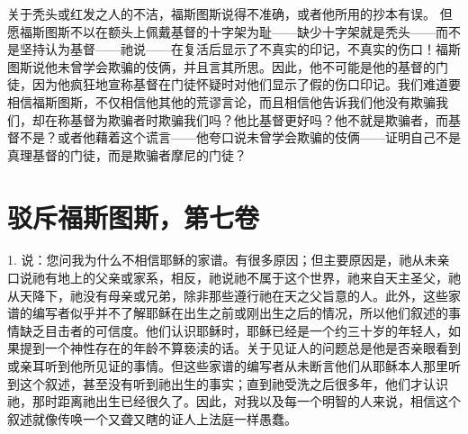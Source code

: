 关于秃头或红发之人的不洁，福斯图斯说得不准确，或者他所用的抄本有误。 但愿福斯图斯不以在额头上佩戴基督的十字架为耻——缺少十字架就是秃头——而不是坚持认为基督——祂说——在复活后显示了不真实的印记，不真实的伤口！福斯图斯说他未曾学会欺骗的伎俩，并且言其所思。因此，他不可能是他的基督的门徒，因为他疯狂地宣称基督在门徒怀疑时对他们显示了假的伤口印记。我们难道要相信福斯图斯，不仅相信他其他的荒谬言论，而且相信他告诉我们他没有欺骗我们，却在称基督为欺骗者时欺骗我们吗？他比基督更好吗？他不就是欺骗者，而基督不是？或者他藉着这个谎言——他夸口说未曾学会欺骗的伎俩——证明自己不是真理基督的门徒，而是欺骗者摩尼的门徒？\par



\section{驳斥福斯图斯，第七卷}

\par

1. 说：您问我为什么不相信耶稣的家谱。有很多原因；但主要原因是，祂从未亲口说祂有地上的父亲或家系，相反，祂说祂不属于这个世界，祂来自天主圣父，祂从天降下，祂没有母亲或兄弟，除非那些遵行祂在天之父旨意的人。此外，这些家谱的编写者似乎并不了解耶稣在出生之前或刚出生之后的情况，所以他们叙述的事情缺乏目击者的可信度。他们认识耶稣时，耶稣已经是一个约三十岁的年轻人，如果提到一个神性存在的年龄不算亵渎的话。关于见证人的问题总是他是否亲眼看到或亲耳听到他所见证的事情。但这些家谱的编写者从未断言他们从耶稣本人那里听到这个叙述，甚至没有听到祂出生的事实；直到祂受洗之后很多年，他们才认识祂，那时距离祂出生已经很久了。因此，对我以及每一个明智的人来说，相信这个叙述就像传唤一个又聋又瞎的证人上法庭一样愚蠢。\par

